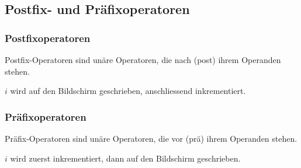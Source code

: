 	\begin{minipage}[t]{9 cm}	
		\subsection{Postfix- und Präfixoperatoren}
			\subsubsection{Postfixoperatoren}
				Postfix-Operatoren sind unäre Operatoren, die nach (post) ihrem Operanden stehen.
				\vspace*{-0.2cm}
				
				$i$ wird auf den Bildschirm geschrieben, anschliessend inkrementiert.
	\end{minipage}
	\hspace*{1cm}		
	\begin{minipage}[t]{9 cm}
			\subsubsection{Präfixoperatoren}
				Präfix-Operatoren sind unäre Operatoren, die vor (prä) ihrem Operanden stehen.
				\vspace*{-0.2cm}
				
				$i$ wird zuerst inkrementiert, dann auf den Bildschirm geschrieben.
		\end{minipage}

